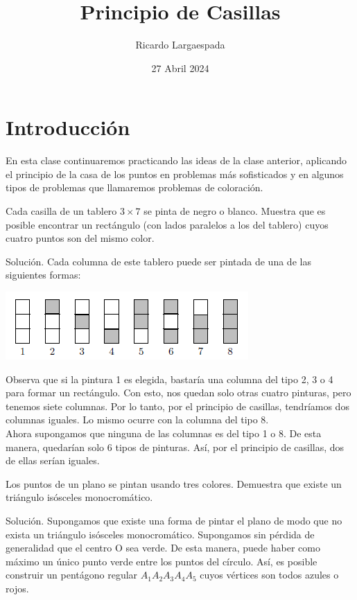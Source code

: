 \documentclass[11pt]{scrartcl}
\begin{document}
\title{Principio de Casillas}
\author{Ricardo Largaespada}
\date{27 Abril 2024}

\maketitle
\section{Introducción}
En esta clase continuaremos practicando las ideas de la clase anterior, aplicando el principio de la casa de los puntos en problemas más sofisticados y en algunos tipos de problemas que llamaremos problemas de coloración.

\begin{example}
Cada casilla de un tablero \(3 \times 7\) se pinta de negro o blanco. Muestra que es posible encontrar un rectángulo (con lados paralelos a los del tablero) cuyos cuatro puntos son del mismo color.
\end{example}
Solución. Cada columna de este tablero puede ser pintada de una de las siguientes formas:
\begin{center}
    \includegraphics[scale=1]{images/clase_08_coloreo.png}
\end{center}
Observa que si la pintura 1 es elegida, bastaría una columna del tipo 2, 3 o 4 para formar un rectángulo. Con esto, nos quedan solo otras cuatro pinturas, pero tenemos siete columnas. Por lo tanto, por el principio de casillas, tendríamos dos columnas iguales. Lo mismo ocurre con la columna del tipo 8.\\

Ahora supongamos que ninguna de las columnas es del tipo 1 o 8. De esta manera, quedarían solo 6 tipos de pinturas. Así, por el principio de casillas, dos de ellas serían iguales.

\begin{example}[Bielorusia, 2007]
    Los puntos de un plano se pintan usando tres colores. Demuestra que existe un triángulo isósceles monocromático.
\end{example}
Solución. Supongamos que existe una forma de pintar el plano de modo que no exista un triángulo isósceles monocromático. Supongamos sin pérdida de generalidad que el centro O sea verde. De esta manera, puede haber como máximo un único punto verde entre los puntos del círculo. Así, es posible construir un pentágono regular \(A_1A_2A_3A_4A_5\) cuyos vértices son todos azules o rojos.
\end{document}
